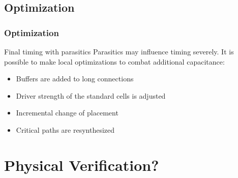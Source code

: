 \documentclass[compress]{beamer}
\begin{document}
\subsection[Opt]{Optimization}
\begin{frame}
	\frametitle{Optimization}
	\begin{block}{Final timing with parasitics}
		Parasitics may influence timing severely. It is possible to make
		local optimizations to combat additional capacitance:
		\begin{itemize}
		\item Buffers are added to long connections
		\item Driver strength of the standard cells is adjusted
		\item Incremental change of placement
		\item Critical paths are resynthesized
	\end{itemize}
	\end{block}
\end{frame}
\section[PVR]{Physical Verification?}
\end{document}
